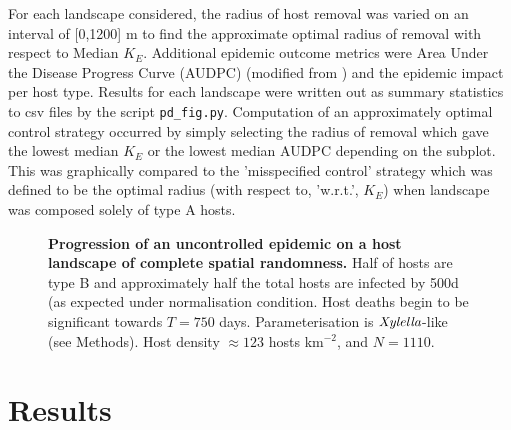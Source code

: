 \documentclass[11pt,letterpaper]{article}
\begin{document}
For each landscape considered, the radius of host removal was varied on an interval of [0,1200] m to find the approximate optimal radius of removal with respect to Median ${K_{E}}$. Additional epidemic outcome metrics were Area Under the Disease Progress Curve (AUDPC) (modified from \cite{Cunniffe2015}) and the epidemic impact per host type. Results for each landscape were written out as summary statistics to csv files by the script \texttt{pd\_fig.py}.
 Computation of an approximately optimal control strategy occurred by simply selecting the radius of removal which gave the lowest median $K_E$ or the lowest median AUDPC depending on the subplot. This was graphically compared to the 'misspecified control' strategy which was defined to be the optimal radius (with respect to, 'w.r.t.', $K_E$) when landscape was composed solely of type A hosts.



\begin{figure}[h]
	\centering
	
	\caption{ \label{epi_nocontrol} \textbf{Progression of an uncontrolled epidemic on a host landscape of complete spatial randomness.} Half of hosts are type B and approximately half the total hosts are infected by 500d (as expected under normalisation condition. Host deaths begin to be significant towards $T = 750$ days. Parameterisation is $\emph{Xylella}$-like (see Methods). Host density $\approx 123$ hosts km$^{-2}$, and $N = 1110$. }
\end{figure}
\FloatBarrier
\section*{Results}
\end{document}
